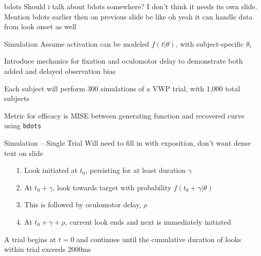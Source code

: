 \documentclass{beamer}
\newcommand{\vp}{\vspace{2mm}}
\newcommand{\xt}{\texttt}
\begin{document}
\begin{frame}{bdots}
 Should i talk about bdots somewhere? I don't think it needs its own slide. Mention bdots earlier then on previous slide be like oh yeah it can handle data from look onset as well
\end{frame}

\begin{frame}{Simulation}
Assume activation can be modeled $f(t|\theta)$, with subject-specific $\theta_i$ \vp

Introduce mechanics for fixation and oculomotor delay to demonstrate both added and delayed observation bias \vp

Each subject will perform 300 simulations of a VWP trial, with 1,000 total subjects \vp

Metric for efficacy is MISE between generating function and recovered curve using \xt{bdots}
\end{frame}


\begin{frame}{Simulation -- Single Trial}\large
Will need to fill in with exposition, don't want dense text on slide

\begin{enumerate}
\item[1.] Look initiated at $t_0$, persisting for at least duration $\gamma$
\item[2.] At $t_0 + \gamma$, look towards target with probability $f(t_0 + \gamma|\theta)$
\item[3.] This is followed by oculomotor delay, $\rho$
\item[4.] At $t_0 + \gamma + \rho$, current look ends and next is immediately initiated
\end{enumerate}

\vspace{5mm}

A trial begins at $t = 0$ and continues until the cumulative duration of looks within trial exceeds 2000ms

\end{frame}
\end{document}

